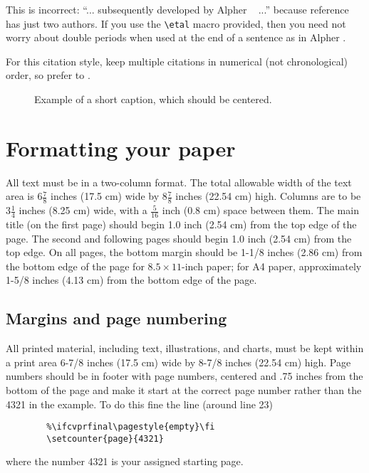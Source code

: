\documentclass[10pt,twocolumn,letterpaper]{article}
\begin{document}
	This is incorrect: ``... subsequently developed by Alpher \etal~\cite{Alpher03} ...''
	because reference~\cite{Alpher03} has just two authors.  If you use the
	\verb'\etal' macro provided, then you need not worry about double periods
	when used at the end of a sentence as in Alpher \etal.
	
	For this citation style, keep multiple citations in numerical (not
	chronological) order, so prefer \cite{Alpher03,Alpher02,Authors14} to
	\cite{Alpher02,Alpher03,Authors14}.
	
	
	\begin{figure*}
		\begin{center}
			\fbox{\rule{0pt}{2in} \rule{.9\linewidth}{0pt}}
		\end{center}
		\caption{Example of a short caption, which should be centered.}
		\label{fig:short}
	\end{figure*}
	
	\section{Formatting your paper}
	
	All text must be in a two-column format. The total allowable width of the
	text area is $6\frac78$ inches (17.5 cm) wide by $8\frac78$ inches (22.54
	cm) high. Columns are to be $3\frac14$ inches (8.25 cm) wide, with a
	$\frac{5}{16}$ inch (0.8 cm) space between them. The main title (on the
	first page) should begin 1.0 inch (2.54 cm) from the top edge of the
	page. The second and following pages should begin 1.0 inch (2.54 cm) from
	the top edge. On all pages, the bottom margin should be 1-1/8 inches (2.86
	cm) from the bottom edge of the page for $8.5 \times 11$-inch paper; for A4
	paper, approximately 1-5/8 inches (4.13 cm) from the bottom edge of the
	page.
	
	\subsection{Margins and page numbering}
	
	All printed material, including text, illustrations, and charts, must be kept
	within a print area 6-7/8 inches (17.5 cm) wide by 8-7/8 inches (22.54 cm)
	high.
	Page numbers should be in footer with page numbers, centered and .75
	inches from the bottom of the page and make it start at the correct page
	number rather than the 4321 in the example.  To do this fine the line (around
	line 23)
	\begin{verbatim}
		%\ifcvprfinal\pagestyle{empty}\fi
		\setcounter{page}{4321}
	\end{verbatim}
	where the number 4321 is your assigned starting page.
	
\end{document}
